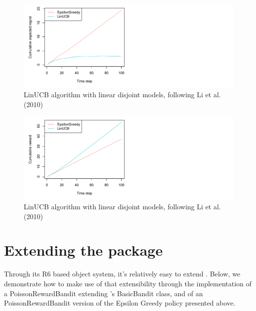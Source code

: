 \documentclass[nojss]{jss}\usepackage[]{graphicx}\usepackage[]{color}
\makeatletter
\def\maxwidth{ %
  \ifdim\Gin@nat@width>\linewidth
    \linewidth
  \else
    \Gin@nat@width
  \fi
}
\newenvironment{knitrout}{}{} %
\makeatother
\begin{document}
\begin{center}
\begin{knitrout}
\color{fgcolor}\begin{figure}[H]
\includegraphics[width=\maxwidth,]{fig/fig3-1} \caption[LinUCB algorithm with linear disjoint models, following Li et al]{LinUCB algorithm with linear disjoint models, following Li et al. (2010)}\label{fig:fig31}
\end{figure}

\begin{figure}[H]
\includegraphics[width=\maxwidth,]{fig/fig3-2} \caption[LinUCB algorithm with linear disjoint models, following Li et al]{LinUCB algorithm with linear disjoint models, following Li et al. (2010)}\label{fig:fig32}
\end{figure}


\end{knitrout}
\end{center}

\section{Extending the package}

Through its R6 based object system, it's relatively easy to extend . Below, we demonstrate how to make use of that extensibility through the implementation of a PoissonRewardBandit extending 's BasicBandit class, and of an PoissonRewardBandit version of the Epsilon Greedy policy presented above.
\end{document}
